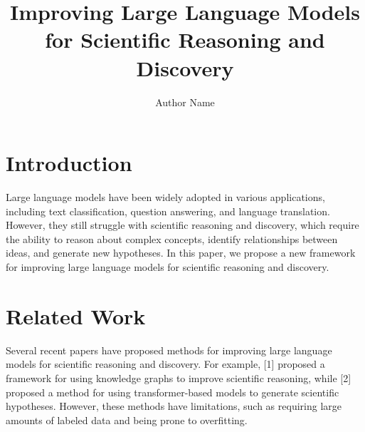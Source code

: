 \documentclass{article}
\begin{document}
\title{Improving Large Language Models for Scientific Reasoning and Discovery}

\author{Author Name}

\maketitle


\section{Introduction}

Large language models have been widely adopted in various applications, including text classification, question answering, and language translation. However, they still struggle with scientific reasoning and discovery, which require the ability to reason about complex concepts, identify relationships between ideas, and generate new hypotheses. In this paper, we propose a new framework for improving large language models for scientific reasoning and discovery.

\section{Related Work}

Several recent papers have proposed methods for improving large language models for scientific reasoning and discovery. For example, [1] proposed a framework for using knowledge graphs to improve scientific reasoning, while [2] proposed a method for using transformer-based models to generate scientific hypotheses. However, these methods have limitations, such as requiring large amounts of labeled data and being prone to overfitting.
\end{document}
